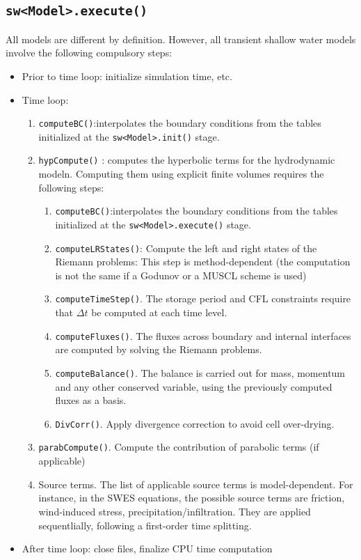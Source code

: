 \subsection{\texttt{sw<Model>.execute()}}

All models are different by definition. However, all transient shallow water models involve the following compulsory steps:
\begin{itemize}
%
%
\item Prior to time loop: initialize simulation time, etc.
%
%
\item Time loop: 
\begin{enumerate}
%
\item \texttt{computeBC()}:interpolates the boundary conditions from the tables initialized at the \texttt{sw<Model>.init()} stage.
%
\item \texttt{hypCompute()} : computes the hyperbolic terms for the hydrodynamic modeln. Computing them using explicit finite volumes requires the following steps:
\begin{enumerate}
%
\item \texttt{computeBC()}:interpolates the boundary conditions from the tables initialized at the \texttt{sw<Model>.execute()} stage.
%
\item \texttt{computeLRStates()}: Compute the left and right states of the Riemann problems: This step is method-dependent (the computation is not the same if a Godunov or a MUSCL scheme is used)
%
\item \texttt{computeTimeStep()}. The storage period and CFL constraints require that $\Delta t$ be computed at each time level.
%
\item \texttt{computeFluxes()}. The fluxes across boundary and internal interfaces are computed by solving the Riemann problems.
%
\item \texttt{computeBalance()}. The balance is carried out for mass, momentum and any other conserved variable, using the previously computed fluxes as a basis.
%
\item \texttt{DivCorr()}. Apply divergence correction to avoid cell over-drying.
%
\end{enumerate}
%
%
\item \texttt{parabCompute()}. Compute the contribution of parabolic terms (if applicable)
%
%
\item Source terms. The list of applicable source terms is model-dependent. For instance, in the SWES equations, the possible source terms are friction, wind-induced stress, precipitation/infiltration. They are applied sequentlially, following a first-order time splitting.

%

\end{enumerate}
%
%
%
\item After time loop: close files, finalize CPU time computation
\end{itemize}
